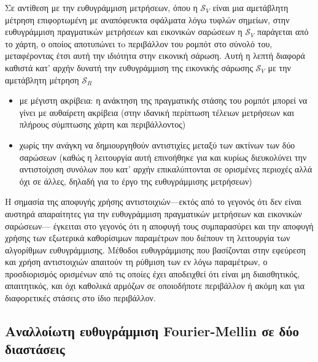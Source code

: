 \begin{gg_box}
\begin{remark}
Σε αντίθεση με την ευθυγράμμιση μετρήσεων, όπου η $\mathcal{S}_V$ είναι μια
αμετάβλητη μέτρηση επιφορτωμένη με αναπόφευκτα σφάλματα λόγω τυφλών σημείων,
στην ευθυγράμμιση πραγματικών μετρήσεων και εικονικών σαρώσεων η
$\mathcal{S}_V$ παράγεται από το χάρτη, ο οποίος αποτυπώνει τo περιβάλλον του
ρομπότ στο σύνολό του, μεταφέροντας έτσι αυτή την ιδιότητα στην εικονική
σάρωση. Αυτή η λεπτή διαφορά καθιστά κατ' αρχήν δυνατή την ευθυγράμμιση της
εικονικής σάρωσης $\mathcal{S}_V$ με την αμετάβλητη μέτρηση $\mathcal{S}_R$
\begin{itemize}
  \item με μέγιστη ακρίβεια: η ανάκτηση της πραγματικής στάσης του ρομπότ
        μπορεί να γίνει με αυθαίρετη ακρίβεια (στην ιδανική περίπτωση τέλειων
        μετρήσεων και πλήρους σύμπτωσης χάρτη και περιβάλλοντος)
  \item χωρίς την ανάγκη να δημιουργηθούν αντιστιχίες μεταξύ των ακτίνων των
        δύο σαρώσεων (καθώς η λειτουργία αυτή επινοήθηκε για και κυρίως
        διευκολύνει την αντιστοίχιση συνόλων που κατ' αρχήν επικαλύπτονται σε
        ορισμένες περιοχές αλλά όχι σε άλλες, δηλαδή για το έργο της
        ευθυγράμμισης μετρήσεων)
\end{itemize}
\end{remark}
\end{gg_box}

\begin{gg_box}
\begin{remark}
Η σημασία της αποφυγής χρήσης αντιστοιχιών---εκτός από το γεγονός ότι δεν είναι
αυστηρά απαραίτητες για την ευθυγράμμιση πραγματικών μετρήσεων και εικονικών
σαρώσεων--- έγκειται στο γεγονός ότι η αποφυγή τους συμπαρασύρει και την
αποφυγή χρήσης των εξωτερικά καθορίσιμων παραμέτρων που διέπουν τη λειτουργία των
αλγορίθμων ευθυγράμμισης. Μέθοδοι ευθυγράμμισης που βασίζονται στην εφεύρεση
και χρήση αντιστοιχιών απαιτούν τη ρύθμιση των εν λόγω παραμέτρων, ο
προσδιορισμός ορισμένων από τις οποίες έχει αποδειχθεί ότι είναι μη
διαισθητικός, απαιτητικός, και όχι καθολικά αρμόζων σε οποιοδήποτε
περιβάλλον ή ακόμη και για διαφορετικές στάσεις στο ίδιο περιβάλλον.
\end{remark}
\end{gg_box}


\subsection{Αναλλοίωτη ευθυγράμμιση Fourier-Mellin σε δύο διαστάσεις}
\label{subsec:01_01_02_7}

